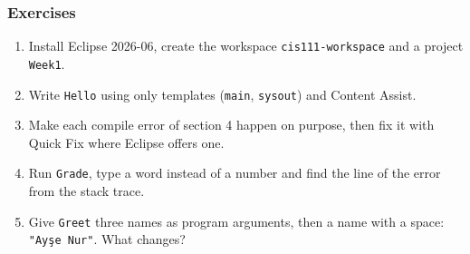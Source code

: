 \documentclass[aspectratio=169,10pt,compress]{beamer}
\begin{document}
\begin{frame}[t,fragile] \frametitle{Exercises}
  \begin{enumerate}\small
    \item Install Eclipse 2026-06, create the workspace \texttt{cis111-workspace} and a project \texttt{Week1}.
    \item Write \texttt{Hello} using only templates (\texttt{main}, \texttt{sysout}) and Content Assist.
    \item Make each compile error of section 4 happen on purpose, then fix it with Quick Fix where Eclipse offers one.
    \item Run \texttt{Grade}, type a word instead of a number and find the line of the error from the stack trace.
    \item Give \texttt{Greet} three names as program arguments, then a name with a space: \texttt{"Ayşe Nur"}. What changes?
  \end{enumerate}
\end{frame}




\begin{frame}[t,fragile]
	\begin{center}
		\vspace{4cm}
	\end{center}
\end{frame}
\end{document}
